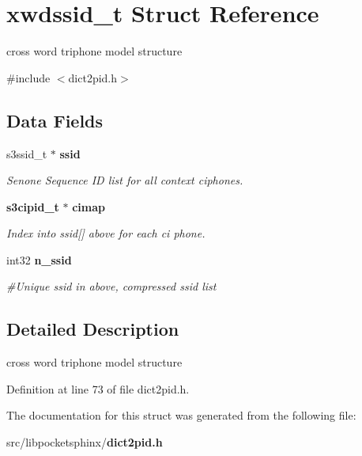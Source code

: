 \section{xwdssid\+\_\+t Struct Reference}
\label{structxwdssid__t}


cross word triphone model structure  




{\ttfamily \#include $<$dict2pid.\+h$>$}

\subsection*{Data Fields}
\begin{DoxyCompactItemize}
\item 
s3ssid\+\_\+t $\ast$ {\bf ssid}\label{structxwdssid__t_adbeeda6e94a51f08626c13414cdad6a8}

\begin{DoxyCompactList}\small\item\em Senone Sequence I\+D list for all context ciphones. \end{DoxyCompactList}\item 
{\bf s3cipid\+\_\+t} $\ast$ {\bf cimap}\label{structxwdssid__t_a502f9241a70383aa260d3390e4ff58fb}

\begin{DoxyCompactList}\small\item\em Index into ssid[] above for each ci phone. \end{DoxyCompactList}\item 
int32 {\bf n\+\_\+ssid}\label{structxwdssid__t_ab4443c642c5aff57c35abed070112d6e}

\begin{DoxyCompactList}\small\item\em \#\+Unique ssid in above, compressed ssid list \end{DoxyCompactList}\end{DoxyCompactItemize}


\subsection{Detailed Description}
cross word triphone model structure 

Definition at line 73 of file dict2pid.\+h.



The documentation for this struct was generated from the following file\+:\begin{DoxyCompactItemize}
\item 
src/libpocketsphinx/{\bf dict2pid.\+h}\end{DoxyCompactItemize}

